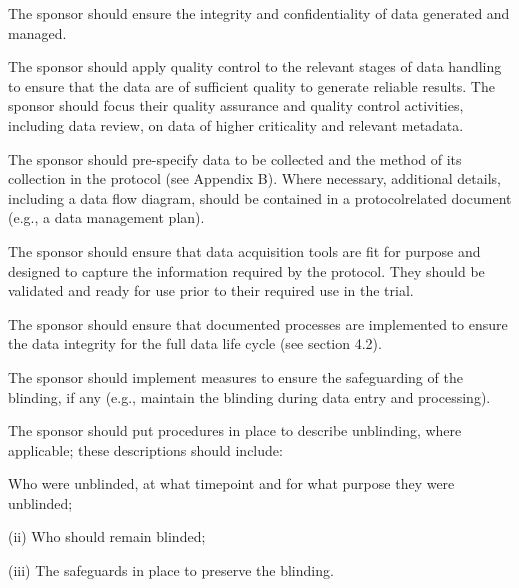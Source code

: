 \documentclass[11pt]{article}
\begin{document}
\begin{description}[leftmargin=2.5cm,style=sameline]

\item[(a)] The sponsor should ensure the integrity and confidentiality of data generated and managed.

\item[(b)] The sponsor should apply quality control to the relevant stages of data handling to ensure that the data are of sufficient quality to generate reliable results. The sponsor should focus their quality assurance and quality control activities, including data review, on data of higher criticality and relevant metadata.

\item[(c)] The sponsor should pre-specify data to be collected and the method of its collection in the protocol (see Appendix B). Where necessary, additional details, including a data flow diagram, should be contained in a protocolrelated document (e.g., a data management plan).

\item[(d)] The sponsor should ensure that data acquisition tools are fit for purpose and designed to capture the information required by the protocol. They should be validated and ready for use prior to their required use in the trial.

\item[(e)] The sponsor should ensure that documented processes are implemented to ensure the data integrity for the full data life cycle (see section 4.2).

\item[(f)] The sponsor should implement measures to ensure the safeguarding of the blinding, if any (e.g., maintain the blinding during data entry and processing).

\item[(g)] The sponsor should put procedures in place to describe unblinding, where applicable; these descriptions should include:

\item[(i)] Who were unblinded, at what timepoint and for what purpose they were unblinded;

\end{description}

(ii) Who should remain blinded;


(iii) The safeguards in place to preserve the blinding.
\end{document}

